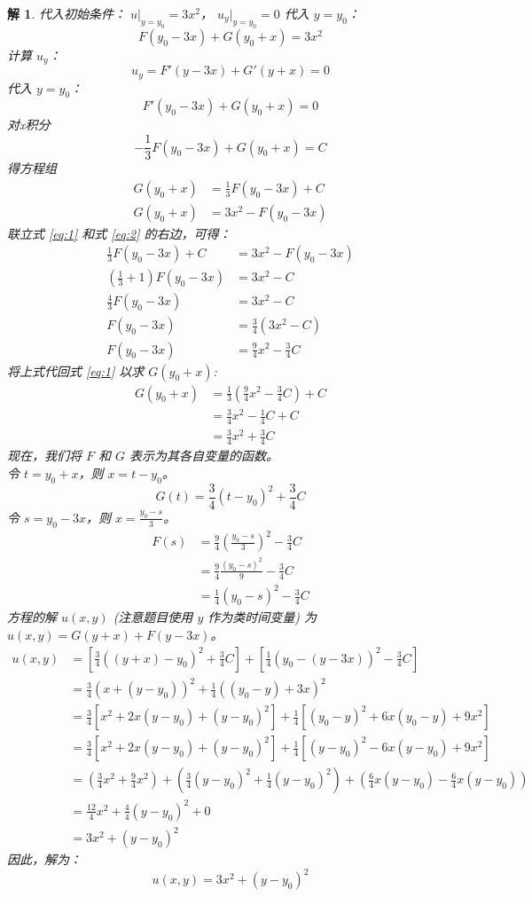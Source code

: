 \documentclass[12pt,a4paper]{article}
\newtheorem*{solution}{解}
\begin{document}
\begin{solution}
		\noindent
	代入初始条件：
 \( u|_{y=y_0} = 3x^2 \)，
 \( u_y|_{y=y_0} = 0 \)
代入 \( y = y_0 \)：
	\[
	F(y_0 - 3x) + G(y_0 + x) = 3x^2
	\]
	计算 \( u_y \)：
	\[
	u_y = F'(y - 3x) + G'(y + x)=0
	\]
	代入 \( y = y_0 \)：
	\[
F'(y_0 - 3x) + G(y_0 + x)=0
	\]
	对x积分
	\[
	-\frac{1}{3}F(y_0 - 3x) + G(y_0 + x)=C
	\]
	得方程组
\begin{align}
	G(y_0+x) &= \frac{1}{3} F(y_0-3x) + C \label{eq:1} \\[6pt]
	G(y_0+x) &= 3x^2 - F(y_0-3x) \label{eq:2}
\end{align}
联立式 \eqref{eq:1} 和式 \eqref{eq:2} 的右边，可得：
\begin{align*}
	\frac{1}{3} F(y_0-3x) + C &= 3x^2 - F(y_0-3x) \\[6pt]
	\left(\frac{1}{3} + 1\right) F(y_0-3x) &= 3x^2 - C \\[6pt]
	\frac{4}{3} F(y_0-3x) &= 3x^2 - C \\[6pt]
	F(y_0-3x) &= \frac{3}{4}(3x^2 - C) \\[6pt]
	F(y_0-3x) &= \frac{9}{4}x^2 - \frac{3}{4}C
\end{align*}
将上式代回式 \eqref{eq:1} 以求 $G(y_0+x)$:
\begin{align*}
	G(y_0+x) &= \frac{1}{3} \left( \frac{9}{4}x^2 - \frac{3}{4}C \right) + C \\[6pt]
	&= \frac{3}{4}x^2 - \frac{1}{4}C + C \\[6pt]
	&= \frac{3}{4}x^2 + \frac{3}{4}C
\end{align*}
现在，我们将 $F$ 和 $G$ 表示为其各自变量的函数。 \\[6pt]
令 $t = y_0+x$，则 $x = t-y_0$。
\[
G(t) = \frac{3}{4}(t-y_0)^2 + \frac{3}{4}C
\]
令 $s = y_0-3x$，则 $x = \frac{y_0-s}{3}$。
\begin{align*}
	F(s) &= \frac{9}{4}\left(\frac{y_0-s}{3}\right)^2 - \frac{3}{4}C \\[6pt]
	&= \frac{9}{4} \frac{(y_0-s)^2}{9} - \frac{3}{4}C \\[6pt]
	&= \frac{1}{4}(y_0-s)^2 - \frac{3}{4}C
\end{align*}
方程的解 $u(x,y)$ (注意题目使用 $y$ 作为类时间变量) 为 $u(x,y) = G(y+x) + F(y-3x)$。
\begin{align*}
	u(x,y) &= \left[ \frac{3}{4}((y+x)-y_0)^2 + \frac{3}{4}C \right] + \left[ \frac{1}{4}(y_0-(y-3x))^2 - \frac{3}{4}C \right] \\[6pt]
	&= \frac{3}{4}(x + (y-y_0))^2 + \frac{1}{4}((y_0-y) + 3x)^2 \\[6pt]
	&= \frac{3}{4}[x^2 + 2x(y-y_0) + (y-y_0)^2] + \frac{1}{4}[(y_0-y)^2 + 6x(y_0-y) + 9x^2] \\[6pt]
	&= \frac{3}{4}[x^2 + 2x(y-y_0) + (y-y_0)^2] + \frac{1}{4}[(y-y_0)^2 - 6x(y-y_0) + 9x^2] \\[6pt]
	&= \left(\frac{3}{4}x^2 + \frac{9}{4}x^2\right) + \left(\frac{3}{4}(y-y_0)^2 + \frac{1}{4}(y-y_0)^2\right) + \left(\frac{6}{4}x(y-y_0) - \frac{6}{4}x(y-y_0)\right) \\[6pt]
	&= \frac{12}{4}x^2 + \frac{4}{4}(y-y_0)^2 + 0 \\[6pt]
	&= 3x^2 + (y-y_0)^2
\end{align*}
	因此，解为：
	\[
	u(x, y) = 3x^2 + (y - y_0)^2
	\]
	

\end{solution}
\end{document}
